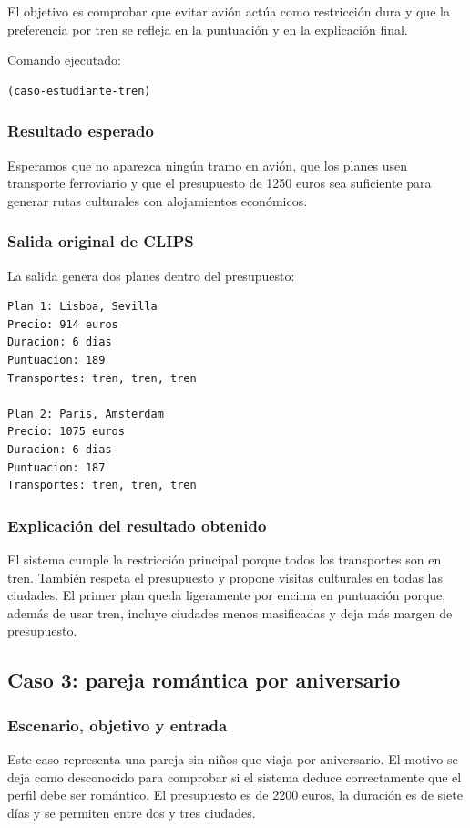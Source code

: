 \documentclass[11pt,a4paper]{article}
\begin{document}
El objetivo es comprobar que evitar avi\'on act\'ua como restricci\'on dura y que
la preferencia por tren se refleja en la puntuaci\'on y en la explicaci\'on final.

Comando ejecutado:
\begin{verbatim}
(caso-estudiante-tren)
\end{verbatim}

\subsubsection{Resultado esperado}
Esperamos que no aparezca ning\'un tramo en avi\'on, que los planes usen
transporte ferroviario y que el presupuesto de 1250 euros sea suficiente para
generar rutas culturales con alojamientos econ\'omicos.

\subsubsection{Salida original de CLIPS}
La salida genera dos planes dentro del presupuesto:
\begin{verbatim}
Plan 1: Lisboa, Sevilla
Precio: 914 euros
Duracion: 6 dias
Puntuacion: 189
Transportes: tren, tren, tren

Plan 2: Paris, Amsterdam
Precio: 1075 euros
Duracion: 6 dias
Puntuacion: 187
Transportes: tren, tren, tren
\end{verbatim}

\subsubsection{Explicaci\'on del resultado obtenido}
El sistema cumple la restricci\'on principal porque todos los transportes son en
tren. Tambi\'en respeta el presupuesto y propone visitas culturales en todas las
ciudades. El primer plan queda ligeramente por encima en puntuaci\'on porque,
adem\'as de usar tren, incluye ciudades menos masificadas y deja m\'as margen de
presupuesto.

\subsection{Caso 3: pareja rom\'antica por aniversario}
\subsubsection{Escenario, objetivo y entrada}
Este caso representa una pareja sin ni\~nos que viaja por aniversario. El motivo
se deja como desconocido para comprobar si el sistema deduce correctamente que
el perfil debe ser rom\'antico. El presupuesto es de 2200 euros, la duraci\'on es
de siete d\'ias y se permiten entre dos y tres ciudades.
\end{document}
